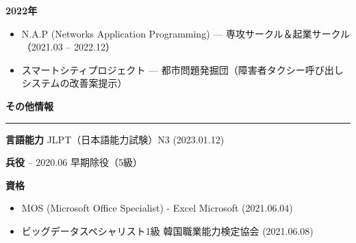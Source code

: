 \documentclass[a4paper, 10pt]{article}
\newcommand{\resumesection}[1]{%
  \vspace{8pt}
  \noindent
  {\large\bfseries #1}
  \vspace{2pt}
  \noindent\hrule
  \vspace{4pt}
}
\begin{document}
\vspace{2pt}
\noindent
\textbf{\japanesefont 2022年}

\begin{itemize}
  \setlength{\itemsep}{1pt}
  \setlength{\parskip}{0pt}
  \item \japanesefont N.A.P (Networks Application Programming) — 専攻サークル＆起業サークル（2021.03 -- 2022.12）
  \item \japanesefont スマートシティプロジェクト — 都市問題発掘団（障害者タクシー呼び出しシステムの改善案提示）
\end{itemize}


\newpage

\resumesection{\japanesefont その他情報}

\vspace{3pt}
\noindent
\textbf{\japanesefont 言語能力} \hfill \japanesefont JLPT（日本語能力試験）N3 (2023.01.12)

\vspace{2pt}
\noindent
\textbf{\japanesefont 兵役} \hfill {} -- 2020.06 早期除役（5級）

\vspace{2pt}
\noindent
\textbf{\japanesefont 資格}

\begin{itemize}
  \setlength{\itemsep}{1pt}
  \setlength{\parskip}{0pt}
  \item \japanesefont MOS (Microsoft Office Specialist) - Excel \hfill Microsoft (2021.06.04)
  \item \japanesefont ビッグデータスペシャリスト1級 \hfill \japanesefont 韓国職業能力検定協会 (2021.06.08)
\end{itemize}
\end{document}
